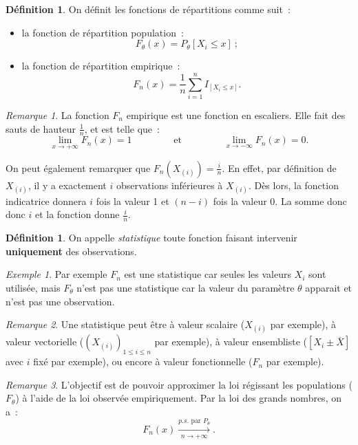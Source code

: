 \documentclass{report}
\newcommand{\minfty}{{-\infty}}
\newcommand{\pinfty}{{+\infty}}
\theoremstyle{definition}
\newtheorem{déf}[thm]{Définition}
\theoremstyle{remark}
\newtheorem*{rmq}{Remarque}
\newtheorem{ex}{Exemple}[chapter]
\begin{document}
		\begin{déf} On définit les fonctions de répartitions comme suit~:
		\begin{itemize}
			\item la fonction de répartition population~:
			      \[F_\theta(x) = P_\theta[X_i \leq x]~;\]
			\item la fonction de répartition empirique~:
			      \[F_n(x) = \frac 1n\sum_{i=1}^nI_{[X_i \leq x]}.\]
		\end{itemize}
		\end{déf}

		\begin{rmq} La fonction $F_n$ empirique est une fonction en escaliers. Elle fait des sauts de hauteur $\frac 1n$, et est telle que~:
		\[\lim_{x \to \pinfty}F_n(x) = 1\qquad\qquad \text{ et } \qquad\qquad \lim_{x \to \minfty}F_n(x) = 0.\]

		On peut également remarquer que $F_n(X_{(i)}) = \frac in$. En effet, par définition de $X_{(i)}$, il y a exactement $i$ observations inférieures à
		$X_{(i)}$. Dès lors, la fonction indicatrice donnera $i$ fois la valeur 1 et $(n-i)$ fois la valeur 0. La somme donc donc $i$ et la fonction donne
		$\frac in$. \end{rmq}

		\begin{déf} On appelle \textit{statistique} toute fonction faisant intervenir \textbf{uniquement} des observations. \end{déf}

		\begin{ex} Par exemple $F_n$ est une statistique car seules les valeurs $X_i$ sont utilisée, mais $F_\theta$ n'est pas une statistique car la valeur
		du paramètre $\theta$ apparait et n'est pas une observation. \end{ex}

		\begin{rmq} Une statistique peut être à valeur scalaire ($X_{(i)}$ par exemple), à valeur vectorielle ($\left(X_{(i)}\right)_{1 \leq i \leq n}$ par
		exemple), à valeur ensembliste ($[X_i \pm \overline X]$ avec $i$ fixé par exemple), ou encore à valeur fonctionnelle ($F_n$ par exemple). \end{rmq}

		\begin{rmq} L'objectif est de pouvoir approximer la loi régissant les populations ($F_\theta$) à l'aide de la loi observée empiriquement. Par la loi
		des grands nombres, on a~:
		\[F_n(x) \xrightarrow[n \to \pinfty]{p.s. \text{ par } P_\theta}.\]
		\end{rmq}
\end{document}
